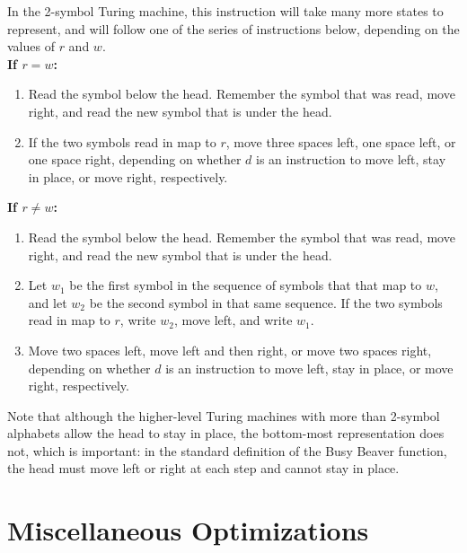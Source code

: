 \documentclass[11pt]{report}
\begin{document}
In the 2-symbol Turing machine, this instruction will take many more states to represent, and will follow one of the series of instructions below, depending on the values of $r$ and $w$. \\

\textbf{If $r = w$:}

\begin{enumerate}

\item Read the symbol below the head. Remember the symbol that was read, move right, and read the new symbol that is under the head. 
\item If the two symbols read in map to $r$, move three spaces left, one space left, or one space right, depending on whether $d$ is an instruction to move left, stay in place, or move right, respectively.

\end{enumerate}

\textbf{If $r \not= w$:}

\begin{enumerate}

\item Read the symbol below the head. Remember the symbol that was read, move right, and read the new symbol that is under the head.
\item Let $w_1$ be the first symbol in the sequence of symbols that that map to $w$, and let $w_2$ be the second symbol in that same sequence. If the two symbols read in map to $r$, write $w_2$, move left, and write $w_1$.
\item Move two spaces left, move left and then right, or move two spaces right, depending on whether $d$ is an instruction to move left, stay in place, or move right, respectively.

\end{enumerate}

Note that although the higher-level Turing machines with more than 2-symbol alphabets allow the head to stay in place, the bottom-most representation does not, which is important: in the standard definition of the Busy Beaver function, the head must move left or right at each step and cannot stay in place.


\section{Miscellaneous Optimizations}
\end{document}

